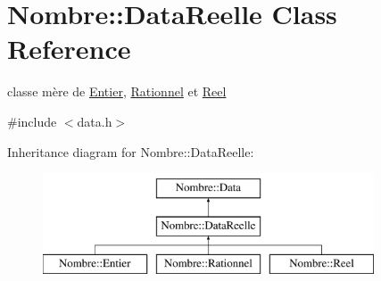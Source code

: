 \hypertarget{classNombre_1_1DataReelle}{
\section{Nombre::DataReelle Class Reference}
\label{classNombre_1_1DataReelle}
}


classe mère de \hyperlink{classNombre_1_1Entier}{Entier}, \hyperlink{classNombre_1_1Rationnel}{Rationnel} et \hyperlink{classNombre_1_1Reel}{Reel}  




{\ttfamily \#include $<$data.h$>$}

Inheritance diagram for Nombre::DataReelle:\begin{figure}[H]
\begin{center}
\leavevmode
\includegraphics[height=3cm]{classNombre_1_1DataReelle}
\end{center}
\end{figure}
